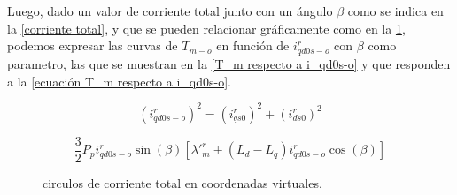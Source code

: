 \documentclass[a4paper, 10pt, onecolumn,journal]{ieeeconf}
\begin{document}
Luego, dado un valor de corriente total junto con un
ángulo $\beta$ como se indica en la \cref{corriente total}, y que se pueden relacionar
gráficamente como en la \cref{restriccion de corriente maxima}, podemos expresar
las curvas de $T_{m-o}$ en función de $i^{r}_{qd0s-o}$ con $\beta$ como parametro, las que
se muestran en la \cref{T_m respecto a i_qd0s-o} y que responden a la \cref{ecuación T_m respecto a i_qd0s-o}.


\begin{equation}
    \left(i^{r}_{qd0s-o}\right)^2 = \left(i^{r}_{qs0}\right)^2 + \left(i^{r}_{ds0}\right)^2
    \label{corriente total}
\end{equation}

\begin{equation}
    \frac{3}{2} P_p i^r_{qd0s-o}\sin(\beta)\left[\lambda'^r_m + (L_d - L_q) i^r_{qd0s-o}\cos(\beta)\right]
    \label{ecuación T_m respecto a i_qd0s-o}
\end{equation}

\begin{figure}[thpb]
    \centering
    \begin{adjustbox}{scale = 0.6}
    \end{adjustbox}
    \caption{circulos de corriente total en coordenadas virtuales.}
    \label{restriccion de corriente maxima}
\end{figure}
\end{document}
